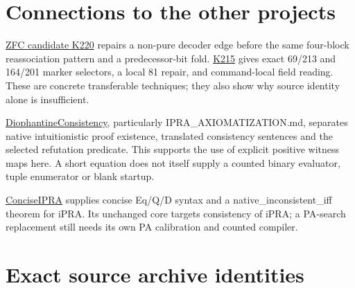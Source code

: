 \documentclass[10pt,a4paper]{article}
\begin{document}
\section{Connections to the other projects}\label{connections-to-the-other-projects}

\href{https://github.com/VladimirReshetnikov/ProveIt/tree/793c68737d94bffa4e32a75bce6cc8058d6d22f0/Computability/BusyBeaver/Research/ZFC/candidate-k220}{ZFC candidate K220} repairs a non-pure decoder edge before the same four-block reassociation pattern and a predecessor-bit fold. \href{https://github.com/VladimirReshetnikov/ProveIt/tree/793c68737d94bffa4e32a75bce6cc8058d6d22f0/Computability/BusyBeaver/Research/ZFC/candidate-k215}{K215} gives exact 69/213 and 164/201 marker selectors, a local 81 repair, and command-local field reading. These are concrete transferable techniques; they also show why source identity alone is insufficient.

\href{https://github.com/VladimirReshetnikov/ProveIt/tree/793c68737d94bffa4e32a75bce6cc8058d6d22f0/Computability/DiophantineConsistency}{DiophantineConsistency}, particularly IPRA\_AXIOMATIZATION.md, separates native intuitionistic proof existence, translated consistency sentences and the selected refutation predicate. This supports the use of explicit positive witness maps here. A short equation does not itself supply a counted binary evaluator, tuple enumerator or blank startup.

\href{https://github.com/VladimirReshetnikov/ProveIt/tree/793c68737d94bffa4e32a75bce6cc8058d6d22f0/Logic/PrimitiveRecursiveArithmetic/ConciseIPRA}{ConciseIPRA} supplies concise Eq/Q/D syntax and a native\_inconsistent\_iff theorem for iPRA. Its unchanged core targets consistency of iPRA; a PA-search replacement still needs its own PA calibration and counted compiler.

\section{Exact source archive identities}\label{exact-source-archive-identities}
\end{document}
